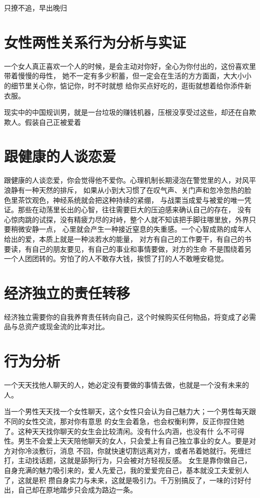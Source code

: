 \documentclass{book}
\begin{document}
只撩不追，早出晚归

\section{女性两性关系行为分析与实证}

一个女人真正喜欢一个人的时候，是会主动对你好，全心为你付出的，这份喜欢里带着慢慢的母性，
她不一定有多少积蓄，但一定会在生活的方方面面，大大小小的细节里关心你，惦记你，时不时就想
给你买点好吃的，逛街就想着给你添件新衣服。

现实中的中国规训男，就是一台垃圾的赚钱机器，压根没享受过这些，却还在自欺欺人。假装自己正被爱着\newpage

\section{跟健康的人谈恋爱}

跟健康的人谈恋爱，你会觉得他不爱你。心理机制长期浸泡在警觉里的人，对风平浪静有一种天然的排斥，
如果从小到大习惯了在叹气声、关门声和忽冷忽热的脸色里茶饮观色，神经系统就会把这种持续的紧绷，
与战栗当成爱与被爱的唯一凭证。那些在动荡里长出的心智，往往需要巨大的压迫感来确认自己的存在，
没有心惊肉跳的试探，没有精疲力尽的对峙，整个人就不知该把手脚往哪里放，外界只要稍微安静一点，
心里就会产生一种接近窒息的失重感。一个心智成熟的成年人给出的爱，本质上就是一种淡若水的能量，
对方有自己的工作要干，有自己的书要读，有自己的朋友要见，有自己的事业和事情要做，对方的生命
不是围绕着另一个人团团转的。穷怕了的人不敢存大钱，挨惯了打的人不敢睡安稳觉。

\section{经济独立的责任转移}

经济独立需要你的自我养育责任转向自己，这个时候购买任何物品，将变成了必需品与总资产或现金流的比率对比。

\section{行为分析}

一个天天找他人聊天的人，她必定没有要做的事情去做，也就是一个没有未来的人。

当一个男性天天找一个女性聊天，这个女性只会认为自己魅力大；一个男性每天跟不同的女性交流，那对你有意思
的女生会着急，也会权衡利弊，反正你捏住她了。这种天天找你聊天的女生会比较清闲。没有什么内涵，也没有什
么不可得性。男生不会爱上天天陪他聊天的女人，只会爱上有自己独立事业的女人。要是对方对你冷淡敷衍，消息
不回，你就快速切割远离对方，或者吊着她就行。死缠烂打，主动找话题，这就是舔狗行为，只会被对方轻视反感。
女生是靠你做自己，自身充满的魅力吸引来的，爱人先爱己，我的爱爱完自己，基本就没工夫爱别人了，这就是积
攒自身实力与未来，这就是吸引力。千万别搞反了，一味的讨好付出，自己却在原地踏步只会成为路边一条。
\end{document}
